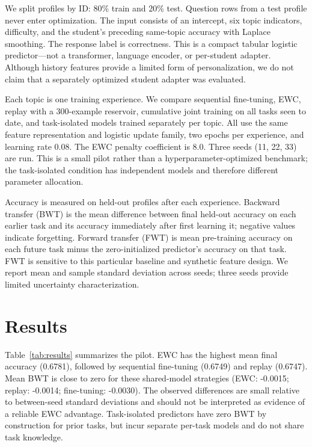 \documentclass[conference]{IEEEtran}
\begin{document}
We split profiles by ID: 80\% train and 20\% test. Question rows from a test profile never enter optimization. The input consists of an intercept, six topic indicators, difficulty, and the student's preceding same-topic accuracy with Laplace smoothing. The response label is correctness. This is a compact tabular logistic predictor—not a transformer, language encoder, or per-student adapter. Although history features provide a limited form of personalization, we do not claim that a separately optimized student adapter was evaluated.

Each topic is one training experience. We compare sequential fine-tuning, EWC, replay with a 300-example reservoir, cumulative joint training on all tasks seen to date, and task-isolated models trained separately per topic. All use the same feature representation and logistic update family, two epochs per experience, and learning rate 0.08. The EWC penalty coefficient is 8.0. Three seeds (11, 22, 33) are run. This is a small pilot rather than a hyperparameter-optimized benchmark; the task-isolated condition has independent models and therefore different parameter allocation.

Accuracy is measured on held-out profiles after each experience. Backward transfer (BWT) is the mean difference between final held-out accuracy on each earlier task and its accuracy immediately after first learning it; negative values indicate forgetting. Forward transfer (FWT) is mean pre-training accuracy on each future task minus the zero-initialized predictor's accuracy on that task. FWT is sensitive to this particular baseline and synthetic feature design. We report mean and sample standard deviation across seeds; three seeds provide limited uncertainty characterization.
\section{Results}
Table~\ref{tab:results} summarizes the pilot. EWC has the highest mean final accuracy (0.6781), followed by sequential fine-tuning (0.6749) and replay (0.6747). Mean BWT is close to zero for these shared-model strategies (EWC: -0.0015; replay: -0.0014; fine-tuning: -0.0030). The observed differences are small relative to between-seed standard deviations and should not be interpreted as evidence of a reliable EWC advantage. Task-isolated predictors have zero BWT by construction for prior tasks, but incur separate per-task models and do not share task knowledge.
\end{document}
